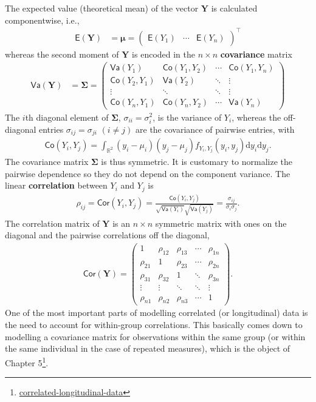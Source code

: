 \documentclass[
  11pt,
  letterpaper,
]{book}
\renewcommand{\href}[2]{#2\footnote{\url{#1}}}
\theoremstyle{definition}
\theoremstyle{definition}
\theoremstyle{definition}
\theoremstyle{remark}
\begin{document}
The expected value (theoretical mean) of the vector \(\boldsymbol{Y}\) is calculated componentwise, i.e.,
\begin{align*}
\mathsf{E}(\boldsymbol{Y}) &= \boldsymbol{\mu}=
\begin{pmatrix}
\mathsf{E}(Y_1) &
\cdots  &
\mathsf{E}(Y_n)
\end{pmatrix}^\top
\end{align*}
whereas the second moment of \(\boldsymbol{Y}\) is encoded in the \(n \times n\) \textbf{covariance} matrix
\begin{align*}
\mathsf{Va}(\boldsymbol{Y}) &= \boldsymbol{\Sigma} = \begin{pmatrix} \mathsf{Va}(Y_1) & \mathsf{Co}(Y_1, Y_2)  & \cdots & \mathsf{Co}(Y_1, Y_n) \\
\mathsf{Co}(Y_2, Y_1) & \mathsf{Va}(Y_2) & \ddots & \vdots \\
\vdots & \ddots & \ddots & \vdots \\
\mathsf{Co}(Y_n, Y_1) & \mathsf{Co}(Y_n, Y_2) &\cdots & \mathsf{Va}(Y_n)
\end{pmatrix}
\end{align*}
The \(i\)th diagonal element of \(\boldsymbol{\Sigma}\), \(\sigma_{ii}=\sigma_i^2\), is the variance of \(Y_i\), whereas the off-diagonal entries \(\sigma_{ij}=\sigma_{ji}\) \((i \neq j)\) are the covariance of pairwise entries, with
\begin{align*}
\mathsf{Co}(Y_i, Y_j) = \int_{\mathbb{R}^2} (y_i-\mu_i)(y_j-\mu_j) f_{Y_i, Y_j}(y_i, y_j) \mathrm{d} y_i \mathrm{d} y_j.
\end{align*}
The covariance matrix \(\boldsymbol{\Sigma}\) is thus symmetric. It is customary to normalize the pairwise dependence so they do not depend on the component variance. The linear \textbf{correlation} between \(Y_i\) and \(Y_j\) is
\begin{align*}
\rho_{ij}=\mathsf{Cor}(Y_i,Y_j)=\frac{\mathsf{Co}(Y_i, Y_j)}{\sqrt{\mathsf{Va}(Y_i)}\sqrt{\mathsf{Va}(Y_j)}}=\frac{\sigma_{ij}}{\sigma_i\sigma_j}.
\end{align*}
The correlation matrix of \(\boldsymbol{Y}\) is an
\(n\times n\) symmetric matrix with ones on the diagonal and the pairwise correlations off the diagonal,
\begin{align*}
\mathsf{Cor}(\boldsymbol{Y})=
\begin{pmatrix}
1 & \rho_{12} & \rho_{13} & \cdots & \rho_{1n}\\
\rho_{21} & 1 & \rho_{23} & \cdots & \rho_{2n} \\
\rho_{31} & \rho_{32} & 1 & \ddots & \rho_{3n} \\
\vdots & \vdots & \ddots & \ddots & \vdots \\
\rho_{n1} & \rho_{n2} & \rho_{n3} & \cdots & 1
\end{pmatrix}.
\end{align*}
One of the most important parts of modelling
correlated (or longitudinal) data is the need to account for within-group correlations. This basically comes down to modelling a covariance matrix for observations within the same group (or within the same individual in the case of repeated measures), which is the object of \href{correlated-longitudinal-data}{Chapter 5}.
\end{document}
